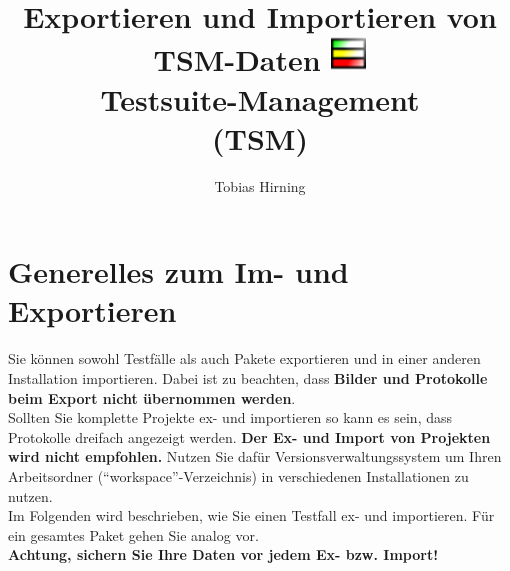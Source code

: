 \documentclass[11pt,a4paper,titlepage]{article}
\title{{\Huge Exportieren und Importieren von TSM-Daten} \linebreak \linebreak
\includegraphics[width= 35px]{../BilderHandbuch/icon32.png} \\
\textbf{Testsuite-Management\\ (TSM)}}
\author{Tobias Hirning}
\begin{document}
\maketitle
\pagebreak

\tableofcontents
\pagebreak

\flushleft
\section{Generelles zum Im- und Exportieren}
Sie können sowohl Testfälle als auch Pakete exportieren und in einer anderen Installation importieren. Dabei ist zu beachten, dass \textbf{Bilder und Protokolle beim Export nicht übernommen werden}.\\
Sollten Sie komplette Projekte ex- und importieren so kann es sein, dass Protokolle dreifach angezeigt werden. \textbf{Der Ex- und Import von Projekten wird nicht empfohlen.} Nutzen Sie dafür Versionsverwaltungssystem um Ihren Arbeitsordner
 ("`workspace"'-Verzeichnis) in verschiedenen Installationen zu nutzen.\\
Im Folgenden wird beschrieben, wie Sie einen Testfall ex- und importieren. Für ein gesamtes Paket gehen Sie analog vor.\\
\vspace{\baselineskip}
\textbf{Achtung, sichern Sie Ihre Daten vor jedem Ex- bzw. Import!}
\end{document}
